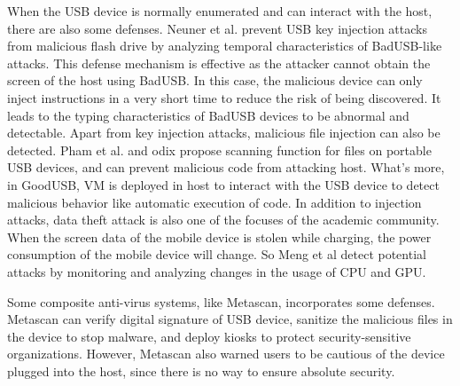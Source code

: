 When the USB device is normally enumerated and can interact with the host, there are also some defenses. 
Neuner et al.\cite{neuner2018usblock} prevent USB key injection attacks from malicious flash drive by analyzing temporal characteristics of BadUSB-like attacks. This defense mechanism is effective as the attacker cannot obtain the screen of the host using BadUSB. In this case, the malicious device can only inject instructions in a very short time to reduce the risk of being discovered. It leads to the typing characteristics of BadUSB devices to be abnormal and detectable. Apart from key injection attacks, malicious file injection can also be detected. Pham et al. \cite{pham2010optimizing} and odix\cite{OLEA} propose scanning function for files on portable USB devices, and can prevent malicious code from attacking host. What's more, in GoodUSB, VM is deployed in host to interact with the USB device to detect malicious behavior like automatic execution of code. In addition to injection attacks, data theft attack is also one of the focuses of the academic community. When the screen data of the mobile device is stolen while charging, the power consumption of the mobile device will change. So Meng et al\cite{meng2018252} detect potential attacks by monitoring and analyzing changes in the usage of CPU and GPU.

Some composite anti-virus systems, like Metascan\cite{OPSWAT}, incorporates some defenses. Metascan can verify digital signature of USB device, sanitize the malicious files in the device to stop malware, and deploy kiosks to protect security-sensitive organizations. However, Metascan also warned users to be cautious of the device plugged into the host, since there is no way to ensure absolute security.



